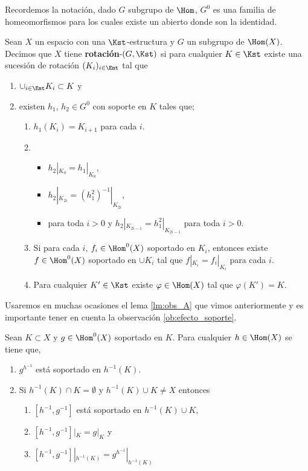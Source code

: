 Recordemos la notación, dado $G$ subgrupo de $\Hom$, $G^0$ es una familia de homeomorfismos para los cuales existe un abierto donde son la identidad.

\begin{df}
Sean $X$ un espacio con una $\Kst$-estructura y $G$ un subgrupo de $\Hom(X)$. Decimos que $X$ tiene \textbf{rotación}-$(G,\Kst)$ si para cualquier $K \in \Kst$ existe una sucesión de rotación $(K_i)_{i \in \Ent}$ tal que 

	\begin{enumerate}
	\item $\cup_{i \in \Ent} K_i \subset K$ y
	\item existen $h_1$, $h_2 \in G^0$ con soporte en $K$ tales que;  

		\begin{enumerate}
		\item $h_1(K_i)=K_{i+1}$ para cada $i$.
		
		\item  \begin{itemize}
					\item $h_2|_{K_0}=h_1|_{K_0}$, 
					\item $h_2|_{K_{2i}}=(h_1^2)^{-1}|_{K_{2i}}$,
					\item para toda $i >0$ y $h_2|_{K_{2i-1}}=h_1^2|_{K_{2i-1}}$ para toda $i >0$.
			   \end{itemize}		 
			
		\item Si para cada $i$, $f_i \in \Hom^0(X)$ soportado en $K_i$, entonces existe $f \in \Hom^0(X)$ soportado en $\cup K_i$ tal que $f|_{K_i}=f_i|_{K_i}$ para cada $i$.
		
		\item Para cualquier $K' \in \Kst$ existe $\varphi \in \Hom(X)$ tal que $\varphi(K')=K.$

		\end{enumerate}

	\end{enumerate}
\end{df}

Usaremos en muchas ocasiones el lema \ref{lm:obs_A} que vimos anteriormente y es importante tener en cuenta la observación \ref{ob:efecto_soporte}. 

\begin{lm}\label{lm:obs_A_2}
Sean $K \subset X$ y $g \in \Hom^0(X)$ soportado en $K$. Para cualquier $h \in \Hom(X)$ se tiene que,
 
	\begin{enumerate}
	\item  $g^{h^{-1}}$ está soportado en $h^{-1}(K)$.
	\item Si $h^{-1}(K) \cap K = \emptyset$ y $h^{-1}(K) \cup K \neq X$  entonces
		\begin{enumerate}
		\item $[h^{-1},g^{-1}]$ está soportado en $h^{-1}(K) \cup K$,
		\item $[h^{-1},g^{-1}]|_K=g|_K$ y 
		\item $[h^{-1},g^{-1}]|_{h^{-1}(K)}=g^{h^{-1}}|_{h^{-1}(K)}$
		\end{enumerate}	
	\end{enumerate}
\end{lm}

